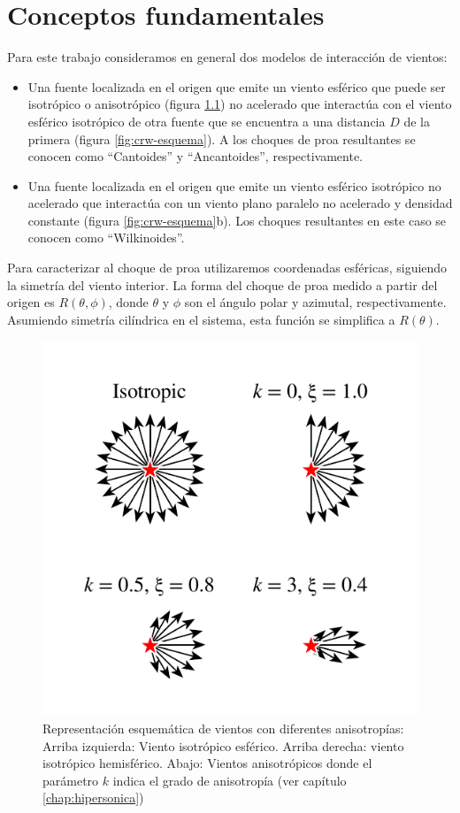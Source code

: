 \chapter{Conceptos fundamentales}
\label{sec:Modelo-generico}
Para este trabajo consideramos en general dos modelos de interacción de vientos:
\begin{itemize}
\item Una fuente localizada en el origen que emite un viento esférico que puede ser isotrópico o anisotrópico (figura \ref{fig:isotropic-aniso}) no acelerado que interactúa con el viento esférico isotrópico de otra fuente que se encuentra a una distancia $D$ de la primera (figura \ref{fig:crw-esquema}). A los choques de proa resultantes se conocen como ``Cantoides'' y ``Ancantoides'', respectivamente.
\item Una fuente localizada en el origen que emite un viento esférico isotrópico no acelerado que interactúa con un viento plano paralelo no acelerado y densidad constante (figura \ref{fig:crw-esquema}b). Los choques resultantes en este caso se conocen como ``Wilkinoides''.
\end{itemize}
Para caracterizar al choque de proa utilizaremos coordenadas esféricas, siguiendo la simetría del viento interior. La forma del choque de proa medido a partir del origen es $R(\theta, \phi)$, donde $\theta$ y $\phi$ son el ángulo polar y azimutal, respectivamente. Asumiendo simetría cilíndrica en el sistema, esta función se simplifica a $R(\theta)$.
\begin{figure}
  \includegraphics[width=0.5\linewidth]{./Figures/anisotropic-arrows}
  \caption{Representación esquemática de vientos con diferentes anisotropías: Arriba izquierda: Viento isotrópico esférico. Arriba derecha: viento isotrópico hemisférico. Abajo: Vientos anisotrópicos donde el parámetro $k$ indica el grado de anisotropía (ver capítulo \ref{chap:hipersonica})}
    \label{fig:isotropic-aniso}
\end{figure}
